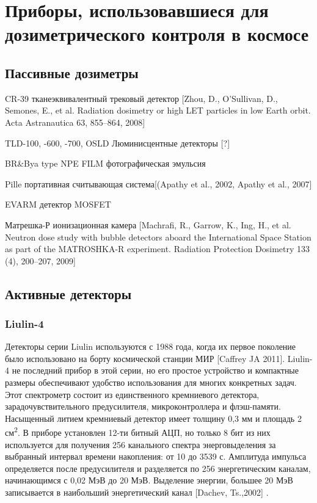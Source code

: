 \section{Приборы, использовавшиеся для дозиметрического контроля в космосе} \label{sect1_3}


\subsection{Пассивные дозиметры} \label{subsect1_3_1}



CR-39 тканеэквивалентный трековый детектор [Zhou, D., O'Sullivan, D., Semones, E., et al. Radiation dosimetry or high LET particles in low Earth orbit. Acta Astranautica 63, 855--864, 2008]


TLD-100, -600, -700, OSLD Люминисцентные детекторы [?]


BR\&Bya type NPE FILM фотографическая эмульсия


Pille портативная считывающая система[(Apathy et al., 2002, Apathy et al., 2007]


EVARM детектор MOSFET 


Матрешка-Р ионизационная камера [Machrafi, R., Garrow, K., Ing, H., et al. Neutron dose study with bubble detectors aboard the International Space Station as part of the MATROSHKA-R experiment. Radiation Protection Dosimetry 133 (4), 200--207, 2009]

\subsection{Активные детекторы} \label{subsect1_3_2}

\subsubsection{Liulin-4}

Детекторы серии Liulin используются с 1988 года, когда их первое поколение было использовано на борту космической станции МИР [Caffrey JA 2011]. Liulin-4 не последний прибор в этой серии, но его простое устройство и компактные размеры обеспечивают удобство использования для многих конкретных задач. Этот спектрометр состоит из единственного кремниевого детектора, зарадочувствительного предусилителя, микроконтроллера и флэш-памяти. Насыщенный литием кремниевый детектор имеет толщину 0,3 мм и площадь 2 см\textsuperscript{2}. В приборе установлен 12-ти битный АЦП, но только 8 бит из них используется для получения 256 канального спектра энерговыделения за выбранный интервал времени накопления: от 10 до 3539 с. Амплитуда импульса определяется после предусилителя и разделяется по 256 энергетическим каналам, начинающимся с 0,02 МэВ до 20 МэВ. Выделение энергии, большее 20 МэВ записывается в наибольший энергетический канал [Dachev, Ts.,2002] .


